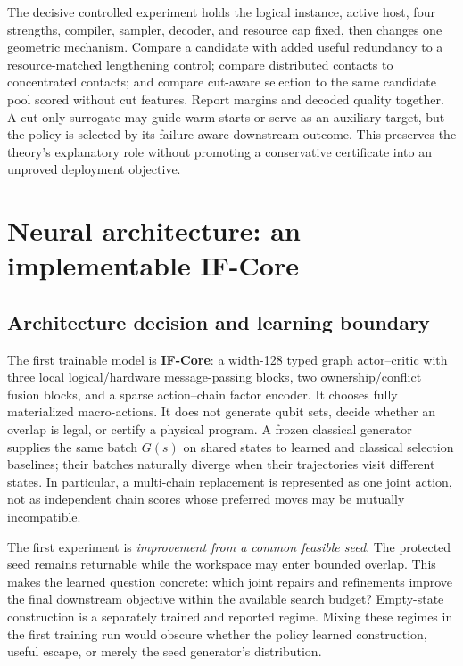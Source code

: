 \documentclass[11pt,a4paper]{article}
\theoremstyle{definition}\newtheorem{definition}[proposition]{Definition}
\begin{document}
The decisive controlled experiment holds the logical instance, active host, four strengths, compiler, sampler, decoder, and resource cap fixed, then changes one geometric mechanism. Compare a candidate with added useful redundancy to a resource-matched lengthening control; compare distributed contacts to concentrated contacts; and compare cut-aware selection to the same candidate pool scored without cut features. Report margins and decoded quality together. A cut-only surrogate may guide warm starts or serve as an auxiliary target, but the policy is selected by its failure-aware downstream outcome. This preserves the theory's explanatory role without promoting a conservative certificate into an unproved deployment objective.
 \section{Neural architecture: an implementable IF-Core}
\label{sec:model}

\subsection{Architecture decision and learning boundary}

The first trainable model is \textbf{IF-Core}: a width-128 typed graph actor--critic with three local logical/hardware message-passing blocks, two ownership/conflict fusion blocks, and a sparse action--chain factor encoder. It chooses fully materialized macro-actions. It does not generate qubit sets, decide whether an overlap is legal, or certify a physical program. A frozen classical generator supplies the same batch $G(s)$ on shared states to learned and classical selection baselines; their batches naturally diverge when their trajectories visit different states. In particular, a multi-chain replacement is represented as one joint action, not as independent chain scores whose preferred moves may be mutually incompatible.

The first experiment is \emph{improvement from a common feasible seed}. The protected seed remains returnable while the workspace may enter bounded overlap. This makes the learned question concrete: which joint repairs and refinements improve the final downstream objective within the available search budget? Empty-state construction is a separately trained and reported regime. Mixing these regimes in the first training run would obscure whether the policy learned construction, useful escape, or merely the seed generator's distribution.
\end{document}
